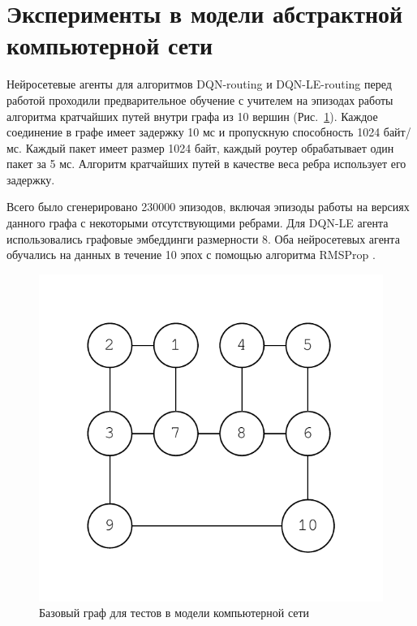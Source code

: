 \documentclass[specification,annotation,times]{itmo-student-thesis}
\theoremstyle{definition}
\begin{document}
\section{Эксперименты в модели абстрактной компьютерной сети}\label{experiments:network}

Нейросетевые агенты для алгоритмов DQN-routing и DQN-LE-routing перед работой
проходили предварительное обучение с учителем на эпизодах работы алгоритма
кратчайших путей внутри графа из 10 вершин (Рис.~\ref{fig-simple-network}).
Каждое соединение в графе имеет задержку 10 мс и пропускную способность 1024 байт/мс.
Каждый пакет имеет размер 1024 байт, каждый роутер обрабатывает один пакет за 5
мс. Алгоритм кратчайших путей в качестве веса ребра использует его задержку.

Всего было сгенерировано 230000 эпизодов, включая эпизоды работы на версиях
данного графа с некоторыми отсутствующими ребрами. Для DQN-LE агента
использовались графовые эмбеддинги размерности 8. Оба нейросетевых агента
обучались на данных в течение 10 эпох с помощью алгоритма RMSProp \cite{tieleman2012lecture}.

\begin{figure}[!h]
  \caption{Базовый граф для тестов в модели компьютерной сети}\label{fig-simple-network}
  \centering
  \includegraphics[scale=0.6]{graph-2.pdf}
\end{figure}
\end{document}
